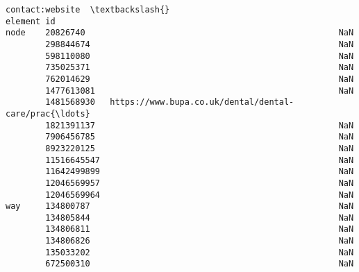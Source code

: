 \documentclass[11pt]{article}
\begin{document}
\begin{tcolorbox}[breakable, size=fbox, boxrule=.5pt, pad at break*=1mm, opacityfill=0]
\begin{Verbatim}[commandchars=\\\{\}]
                                                       contact:website  \textbackslash{}
element id
node    20826740                                                   NaN
        298844674                                                  NaN
        598110080                                                  NaN
        735025371                                                  NaN
        762014629                                                  NaN
        1477613081                                                 NaN
        1481568930   https://www.bupa.co.uk/dental/dental-care/prac{\ldots}
        1821391137                                                 NaN
        7906456785                                                 NaN
        8923220125                                                 NaN
        11516645547                                                NaN
        11642499899                                                NaN
        12046569957                                                NaN
        12046569964                                                NaN
way     134800787                                                  NaN
        134805844                                                  NaN
        134806811                                                  NaN
        134806826                                                  NaN
        135033202                                                  NaN
        672500310                                                  NaN


\end{Verbatim}
\end{tcolorbox}
\end{document}
